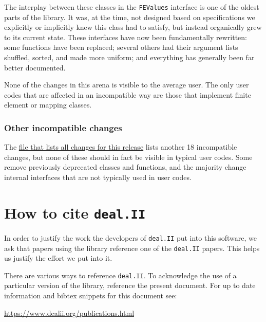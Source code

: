 \documentclass{ansarticle-preprint}
\newcommand{\specialword}[1]{\texttt{#1}}
\newcommand{\dealii}{{\specialword{deal.II}}}
\begin{document}
The interplay between these classes in the \texttt{FEValues} interface
is one of the oldest parts of the library. It was, at the time, not
designed based on specifications we explicitly or implicitly knew this
class had to satisfy, but instead organically grew to its current
state. These interfaces have now been fundamentally rewritten: some
functions have been replaced; several others had their argument lists
shuffled, sorted, and made more uniform; and everything has generally
been far better documented.

None of the changes in this arena is visible to the average user. The
only user codes that are affected in an incompatible way are those
that implement finite element or mapping classes.

\subsubsection{Other incompatible changes}

The
\href{https://www.dealii.org/8.4.0/doxygen/deal.II/changes_between_8_3_0_and_8_4.html}{file
  that lists all changes for this release} lists another 18
incompatible changes, but none of these should in fact be visible in
typical user codes. Some remove previously deprecated classes and
functions, and the majority change internal interfaces that are not
typically used in user codes.



\section{How to cite \dealii{}}\label{sec:cite}

In order to justify the work the developers of \dealii{} put into this
software, we ask that papers using the library reference one of the
\dealii{} papers. This helps us justify the effort we put into it.

There are various ways to reference \dealii{}. To acknowledge the use of a
particular version of the library, reference the present document. For up
to date information and bibtex snippets for this document see:

\bigskip

\begin{center}
 \url{https://www.dealii.org/publications.html}
\end{center}

\bigskip

\end{document}
